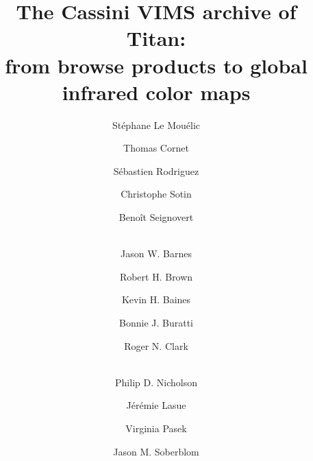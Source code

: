 \documentclass[preprint,twocolumn,5p,authoryear,compress,colorlinks=true]{elsarticle}
\begin{document}
\begin{frontmatter}
\title{The Cassini VIMS archive of Titan:\\from browse products to global infrared color maps}

\author[LPG]{St\'ephane {Le Mou\'elic}}
\author[ESAC]{Thomas Cornet}
\author[IPGP]{S\'ebastien Rodriguez}
\author[JPL]{Christophe Sotin}
\author[LPG]{Beno\^{i}t Seignovert}
\author[DPUI]{~\\Jason W. Barnes}
\author[DPS]{Robert H. Brown}
\author[JPL]{Kevin H. Baines}
\author[JPL]{Bonnie J. Buratti}
\author[PSI]{Roger N. Clark}
\author[Cornell]{~\\Philip D. Nicholson}
\author[IRAP]{J\'er\'emie Lasue}
\author[DPS]{Virginia Pasek}
\author[MIT]{Jason M. Soberblom}

\address[LPG]{LPG, UMR 6112, CNRS, Universit\'e de Nantes, 2 rue de la Houssini\`ere, 44322 Nantes, France}
\address[ESAC]{European Space Astronomy Centre (ESA/ESAC), Villanueva de la Canada, Madrid, Spain}
\address[IPGP]{IPGP, CNRS-UMR 7154, Universit\'e Paris-Diderot, USPC, Paris, France}
\address[JPL]{Jet Propulsion Laboratory, California Institute of Technology, Pasadena, CA 91109, USA}
\address[DPUI]{Department of Physics, University of Idaho, Engineering-Physics Building, Moscow, ID 83844, USA}
\address[DPS]{Department of Planetary Sciences, University of Arizona, Tucson, AZ 85721, USA}
\address[PSI]{Planetary Science Institute, Tucson, USA}
\address[Cornell]{Department of Astronomy, Cornell University, Ithaca, NY 14853, USA}
\address[IRAP]{IRAP, Toulouse, France}
\address[MIT]{MIT, Department of Earth, Atmospheric and Planetary Sciences, Cambridge, MA 02139, USA}



\end{frontmatter}
\end{document}

